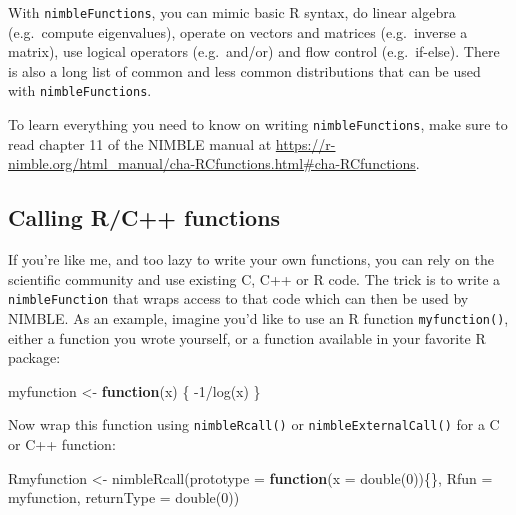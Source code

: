 \documentclass[
  12pt,
]{krantz}
\newenvironment{Shaded}{\begin{snugshade}}{\end{snugshade}}
\newcommand{\AttributeTok}[1]{\textcolor[rgb]{0.77,0.63,0.00}{#1}}
\newcommand{\ControlFlowTok}[1]{\textcolor[rgb]{0.13,0.29,0.53}{\textbf{#1}}}
\newcommand{\DecValTok}[1]{\textcolor[rgb]{0.00,0.00,0.81}{#1}}
\newcommand{\FunctionTok}[1]{\textcolor[rgb]{0.00,0.00,0.00}{#1}}
\newcommand{\NormalTok}[1]{#1}
\newcommand{\OtherTok}[1]{\textcolor[rgb]{0.56,0.35,0.01}{#1}}
\newcommand{\SpecialCharTok}[1]{\textcolor[rgb]{0.00,0.00,0.00}{#1}}
\newcommand{\StringTok}[1]{\textcolor[rgb]{0.31,0.60,0.02}{#1}}
\begin{document}
With \texttt{nimbleFunctions}, you can mimic basic R syntax, do linear algebra (e.g.~compute eigenvalues), operate on vectors and matrices (e.g.~inverse a matrix), use logical operators (e.g.~and/or) and flow control (e.g.~if-else). There is also a long list of common and less common distributions that can be used with \texttt{nimbleFunctions}.

To learn everything you need to know on writing \texttt{nimbleFunctions}, make sure to read chapter 11 of the NIMBLE manual at \url{https://r-nimble.org/html_manual/cha-RCfunctions.html\#cha-RCfunctions}.

\hypertarget{callrfninnimble}{%
\subsection{Calling R/C++ functions}\label{callrfninnimble}}

If you're like me, and too lazy to write your own functions, you can rely on the scientific community and use existing C, C++ or R code. The trick is to write a \texttt{nimbleFunction} that wraps access to that code which can then be used by NIMBLE. As an example, imagine you'd like to use an R function \texttt{myfunction()}, either a function you wrote yourself, or a function available in your favorite R package:

\begin{Shaded}
\begin{Highlighting}[]
\NormalTok{myfunction }\OtherTok{\textless{}{-}} \ControlFlowTok{function}\NormalTok{(x) \{}
  \SpecialCharTok{{-}}\DecValTok{1}\SpecialCharTok{/}\FunctionTok{log}\NormalTok{(x)}
\NormalTok{\}}
\end{Highlighting}
\end{Shaded}

Now wrap this function using \texttt{nimbleRcall()} or \texttt{nimbleExternalCall()} for a C or C++ function:

\begin{Shaded}
\begin{Highlighting}[]
\NormalTok{Rmyfunction }\OtherTok{\textless{}{-}} \FunctionTok{nimbleRcall}\NormalTok{(}\AttributeTok{prototype =} \ControlFlowTok{function}\NormalTok{(}\AttributeTok{x =} \FunctionTok{double}\NormalTok{(}\DecValTok{0}\NormalTok{))\{\}, }
                           \AttributeTok{Rfun =} \StringTok{\textquotesingle{}myfunction\textquotesingle{}}\NormalTok{,}
                           \AttributeTok{returnType =} \FunctionTok{double}\NormalTok{(}\DecValTok{0}\NormalTok{))}
\end{Highlighting}
\end{Shaded}
\end{document}
